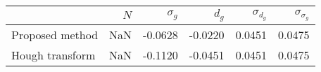 \begin{tabular}{lrrrrr}
\toprule
{} &  $N$ &  $\sigma_g$ &   $d_g$ &  $\sigma_{d_g}$ &  $\sigma_{\sigma_g}$ \\
\midrule
Proposed method &  NaN &     -0.0628 & -0.0220 &          0.0451 &               0.0475 \\
Hough transform &  NaN &     -0.1120 & -0.0451 &          0.0451 &               0.0475 \\
\bottomrule
\end{tabular}
